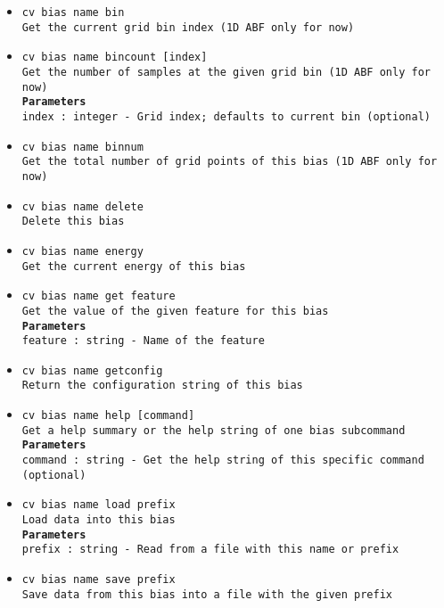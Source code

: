 \begin{itemize}
\item \texttt{cv bias name bin}
\\
\texttt{Get the current grid bin index (1D ABF only for now)}
\item \texttt{cv bias name bincount [index]}
\\
\texttt{Get the number of samples at the given grid bin (1D ABF only for now)}
\\
\texttt{\textbf{Parameters}}
\\
\texttt{index : integer - Grid index; defaults to current bin (optional)}
\item \texttt{cv bias name binnum}
\\
\texttt{Get the total number of grid points of this bias (1D ABF only for now)}
\item \texttt{cv bias name delete}
\\
\texttt{Delete this bias}
\item \texttt{cv bias name energy}
\\
\texttt{Get the current energy of this bias}
\item \texttt{cv bias name get feature}
\\
\texttt{Get the value of the given feature for this bias}
\\
\texttt{\textbf{Parameters}}
\\
\texttt{feature : string - Name of the feature}
\item \texttt{cv bias name getconfig}
\\
\texttt{Return the configuration string of this bias}
\item \texttt{cv bias name help [command]}
\\
\texttt{Get a help summary or the help string of one bias subcommand}
\\
\texttt{\textbf{Parameters}}
\\
\texttt{command : string - Get the help string of this specific command (optional)}
\item \texttt{cv bias name load prefix}
\\
\texttt{Load data into this bias}
\\
\texttt{\textbf{Parameters}}
\\
\texttt{prefix : string - Read from a file with this name or prefix}
\item \texttt{cv bias name save prefix}
\\
\texttt{Save data from this bias into a file with the given prefix}
\\

\end{itemize}
